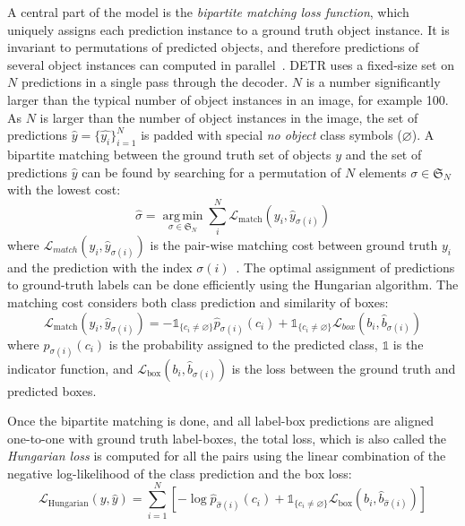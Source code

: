 \documentclass[english,twoside,openright]{HYgraduMLDS}
\begin{document}
A central part of the model is the \textit{bipartite matching loss function}, which uniquely assigns each prediction instance to a ground truth object instance. It is invariant to permutations of predicted objects, and therefore predictions of several object instances can computed in parallel~\cite{DETR}. DETR uses a fixed-size set on $N$ predictions in a single pass through the decoder. $N$ is a number significantly larger than the typical number of object instances in an image, for example 100. As $N$ is larger than the number of object instances in the image, the set of predictions $\hat{y} = \{\hat{y_i}\}_{i=1}^N $ is padded with special \textit{no object} class symbols ($\varnothing$). A bipartite matching between the ground truth set of objects $y$ and the set of predictions $\hat{y}$ can be found by searching for a permutation of $N$ elements $\sigma \in \mathfrak{S}_N $ with the lowest cost:
\begin{equation}
\hat{\sigma} = \operatorname*{arg\,min}_{\sigma \in \mathfrak{S}_N} \sum_{i}^{N} \mathcal{L}_{\text{match}}(y_i, \hat{y}_{\sigma(i)})
\end{equation}
%
where $\mathcal{L}_{match}(y_i, \hat{y}_{\sigma(i)})$ is the pair-wise matching cost between ground truth $y_i$ and the prediction with the index $\sigma(i)$~\cite{DETR}. The optimal assignment of predictions to ground-truth labels can be done efficiently using the Hungarian algorithm. The matching cost considers both class prediction and similarity of boxes: 
\begin{equation}
\mathcal{L}_{\text{match}}(y_i, \hat{y}_{\sigma(i)}) = -\mathds{1}_{\{c_i  \ne \varnothing\}} \hat{p}_{\sigma(i)} (c_i) + \mathds{1}_{\{c_i  \ne \varnothing\}} \mathcal{L}_{box}(b_i, \hat{b}_{\sigma(i)})
\end{equation}
%
where $\hat{p}_{\sigma(i)} (c_i)$ is the probability assigned to the predicted class, $\mathds{1}$ is the indicator function, and  $\mathcal{L}_{\text{box}}(b_i, \hat{b}_{\sigma(i)})$ is the loss between the ground truth and predicted boxes.

Once the bipartite matching is done, and all label-box predictions are aligned one-to-one with ground truth label-boxes, the total loss, which is also called the \textit{Hungarian loss} is computed for all the pairs using the linear combination of the negative log-likelihood of the class prediction and the box loss:
\begin{equation}
\mathcal{L}_{\text{Hungarian}}(y, \hat{y}) = \sum_{i=1}^N \left[-\log{\hat{p}_{\hat{\sigma}(i)} (c_i)} + \mathds{1}_{\{c_i  \ne \varnothing\}} \mathcal{L}_{\text{box}}(b_i, \hat{b}_{\hat{\sigma}(i)}) \right]
\end{equation}
\end{document}
